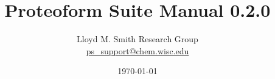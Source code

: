 

\title{Proteoform Suite Manual 0.2.0}
\author{Lloyd M. Smith Research Group \\[2ex]
	\href{mailto:ps_support@chem.wisc.edu}{ps\_support@chem.wisc.edu}}
\date{\today}



\maketitle

\pagebreak

{}
\tableofcontents
\pagebreak


\pagebreak

\pagebreak

\pagebreak

\pagebreak

\pagebreak

\pagebreak

\pagebreak

\pagebreak

\pagebreak

\pagebreak

\pagebreak

\pagebreak

\pagebreak

\pagebreak

\pagebreak

\pagebreak

\pagebreak
%

\pagebreak
{}
\printbibliography


